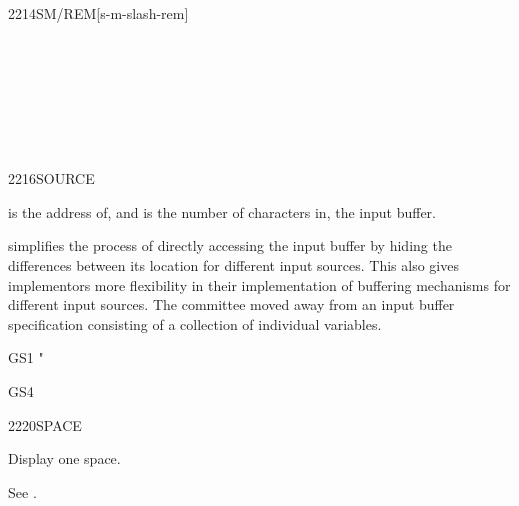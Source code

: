 \begin{worddef}{2214}{SM/REM}[s-m-slash-rem]
\begin{testing}
		 \\
		 \\
		 \\
		 \\
		 \\
		 \\
	\end{testing}
\end{worddef}


\begin{worddef}{2216}{SOURCE}
\item {}

	 is the address of, and  is the number of
	characters in, the input buffer.

	\begin{rationale} %
		 simplifies the process of directly accessing the
		input buffer by hiding the differences between its location
		for different input sources. This also gives implementors more
		flexibility in their implementation of buffering mechanisms
		for different input sources. The committee moved away from an
		input buffer specification consisting of a collection of
		individual variables.
	\end{rationale}

	\begin{testing} %
		\ttfamily
		\word{:} GS1  "  
			   \word{=} \word{Rfrom}  \word{=} \word{;} \\

		\word{:} GS4   \word{!}  \word{;} \\
	\end{testing}
\end{worddef}


\begin{worddef}{2220}{SPACE}
\item \stack{}{}

	Display one space.

	\begin{testing} %
		See .
	\end{testing}
\end{worddef}


